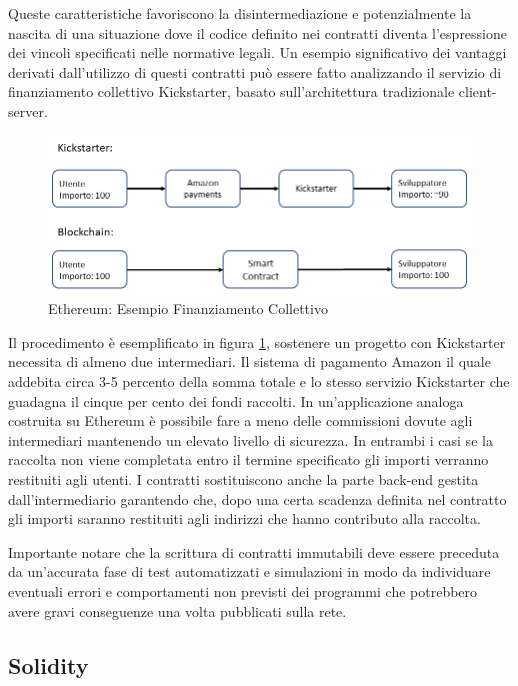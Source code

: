 Queste caratteristiche favoriscono la disintermediazione e potenzialmente la nascita di una situazione dove il codice definito nei contratti diventa l’espressione dei vincoli specificati nelle normative legali. Un esempio significativo dei vantaggi derivati dall'utilizzo di questi contratti può essere fatto analizzando il servizio  di finanziamento collettivo Kickstarter, basato sull'architettura tradizionale client-server.
\\
\begin{figure}[H]
\centering
\includegraphics[width=1\textwidth]{immagini/kickstarter.png}
\caption{Ethereum: Esempio Finanziamento Collettivo}
\label{fig:Kickstarter}
\end{figure}

Il procedimento è esemplificato in figura \ref{fig:Kickstarter}, sostenere un progetto con Kickstarter necessita di almeno due intermediari. Il sistema di pagamento Amazon il quale addebita circa 3-5 percento della somma totale e lo stesso servizio Kickstarter che guadagna il cinque per cento dei fondi raccolti. In un'applicazione analoga costruita su Ethereum è possibile fare a meno delle commissioni dovute agli intermediari mantenendo un elevato livello di sicurezza. In entrambi i casi se la raccolta non viene completata entro il termine specificato gli importi verranno restituiti agli utenti. I contratti sostituiscono anche la parte back-end gestita dall'intermediario garantendo che, dopo una certa scadenza definita nel contratto gli importi saranno restituiti agli indirizzi che hanno contributo alla raccolta. 

Importante notare che la scrittura di contratti immutabili deve essere preceduta da un’accurata fase di test automatizzati e simulazioni in modo da individuare eventuali errori e comportamenti non previsti dei programmi che potrebbero avere gravi conseguenze una volta pubblicati sulla rete.

\subsection{Solidity}

